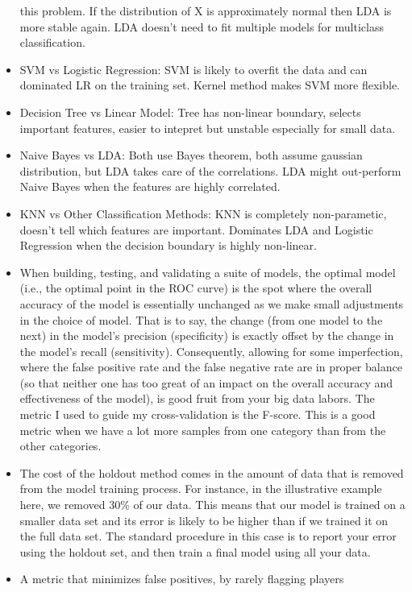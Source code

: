 \documentclass[]{book}
\begin{document}
\begin{itemize}
  this problem. If the distribution of X is approximately normal then
  LDA is more stable again. LDA doesn't need to fit multiple models for
  multiclass classification.
\item
  SVM vs Logistic Regression: SVM is likely to overfit the data and can
  dominated LR on the training set. Kernel method makes SVM more
  flexible.
\item
  Decision Tree vs Linear Model: Tree has non-linear boundary, selects
  important features, easier to intepret but unstable especially for
  small data.
\item
  Naive Bayes vs LDA: Both use Bayes theorem, both assume gaussian
  distribution, but LDA takes care of the correlations. LDA might
  out-perform Naive Bayes when the features are highly correlated.
\item
  KNN vs Other Classification Methods: KNN is completely non-parametic,
  doesn't tell which features are important. Dominates LDA and Logistic
  Regression when the decision boundary is highly non-linear.
\item
  When building, testing, and validating a suite of models, the optimal
  model (i.e., the optimal point in the ROC curve) is the spot where the
  overall accuracy of the model is essentially unchanged as we make
  small adjustments in the choice of model. That is to say, the change
  (from one model to the next) in the model's precision (specificity) is
  exactly offset by the change in the model's recall (sensitivity).
  Consequently, allowing for some imperfection, where the false positive
  rate and the false negative rate are in proper balance (so that
  neither one has too great of an impact on the overall accuracy and
  effectiveness of the model), is good fruit from your big data labors.
  The metric I used to guide my cross-validation is the F-score. This is
  a good metric when we have a lot more samples from one category than
  from the other categories.
\item
  The cost of the holdout method comes in the amount of data that is
  removed from the model training process. For instance, in the
  illustrative example here, we removed 30\% of our data. This means
  that our model is trained on a smaller data set and its error is
  likely to be higher than if we trained it on the full data set. The
  standard procedure in this case is to report your error using the
  holdout set, and then train a final model using all your data.
\item
  A metric that minimizes false positives, by rarely flagging players

\end{itemize}
\end{document}

